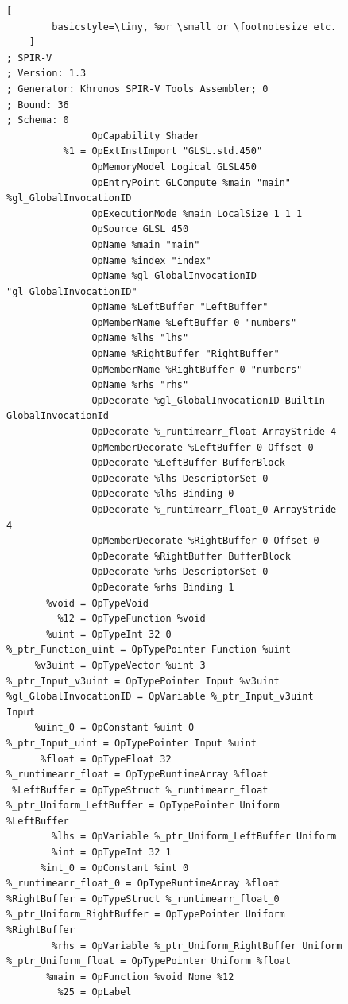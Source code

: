 \documentclass{report}
\begin{document}
\begin{figure}

    \begin{lstlisting}[
        basicstyle=\tiny, %or \small or \footnotesize etc.
    ]
; SPIR-V
; Version: 1.3
; Generator: Khronos SPIR-V Tools Assembler; 0
; Bound: 36
; Schema: 0
               OpCapability Shader
          %1 = OpExtInstImport "GLSL.std.450"
               OpMemoryModel Logical GLSL450
               OpEntryPoint GLCompute %main "main" %gl_GlobalInvocationID
               OpExecutionMode %main LocalSize 1 1 1
               OpSource GLSL 450
               OpName %main "main"
               OpName %index "index"
               OpName %gl_GlobalInvocationID "gl_GlobalInvocationID"
               OpName %LeftBuffer "LeftBuffer"
               OpMemberName %LeftBuffer 0 "numbers"
               OpName %lhs "lhs"
               OpName %RightBuffer "RightBuffer"
               OpMemberName %RightBuffer 0 "numbers"
               OpName %rhs "rhs"
               OpDecorate %gl_GlobalInvocationID BuiltIn GlobalInvocationId
               OpDecorate %_runtimearr_float ArrayStride 4
               OpMemberDecorate %LeftBuffer 0 Offset 0
               OpDecorate %LeftBuffer BufferBlock
               OpDecorate %lhs DescriptorSet 0
               OpDecorate %lhs Binding 0
               OpDecorate %_runtimearr_float_0 ArrayStride 4
               OpMemberDecorate %RightBuffer 0 Offset 0
               OpDecorate %RightBuffer BufferBlock
               OpDecorate %rhs DescriptorSet 0
               OpDecorate %rhs Binding 1
       %void = OpTypeVoid
         %12 = OpTypeFunction %void
       %uint = OpTypeInt 32 0
%_ptr_Function_uint = OpTypePointer Function %uint
     %v3uint = OpTypeVector %uint 3
%_ptr_Input_v3uint = OpTypePointer Input %v3uint
%gl_GlobalInvocationID = OpVariable %_ptr_Input_v3uint Input
     %uint_0 = OpConstant %uint 0
%_ptr_Input_uint = OpTypePointer Input %uint
      %float = OpTypeFloat 32
%_runtimearr_float = OpTypeRuntimeArray %float
 %LeftBuffer = OpTypeStruct %_runtimearr_float
%_ptr_Uniform_LeftBuffer = OpTypePointer Uniform %LeftBuffer
        %lhs = OpVariable %_ptr_Uniform_LeftBuffer Uniform
        %int = OpTypeInt 32 1
      %int_0 = OpConstant %int 0
%_runtimearr_float_0 = OpTypeRuntimeArray %float
%RightBuffer = OpTypeStruct %_runtimearr_float_0
%_ptr_Uniform_RightBuffer = OpTypePointer Uniform %RightBuffer
        %rhs = OpVariable %_ptr_Uniform_RightBuffer Uniform
%_ptr_Uniform_float = OpTypePointer Uniform %float
       %main = OpFunction %void None %12
         %25 = OpLabel

\end{lstlisting}
\end{figure}
\end{document}
